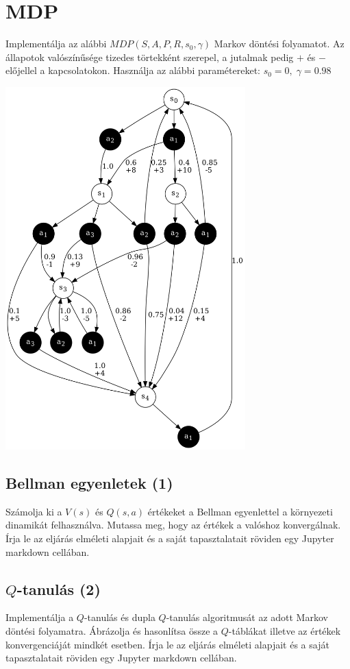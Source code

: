 \documentclass[english]{article}
\begin{document}
\newpage

\section{MDP}

Implementálja az alábbi $MDP(S,A,P,R,s_0,\gamma)$ Markov döntési folyamatot. Az állapotok valószínűsége tizedes törtekként szerepel, a jutalmak pedig $+$ és $-$ előjellel a kapcsolatokon. Használja az alábbi paramétereket: $s_0 = 0, \; \gamma=0.98$

\begin{center}
\includegraphics[width=\textwidth, height=14cm, keepaspectratio]{graphs/3_mdp.png}
\end{center}

\subsection{Bellman egyenletek (1)}
Számolja ki a $V(s)$ és $Q(s,a)$ értékeket a Bellman egyenlettel a környezeti dinamikát felhasználva. Mutassa meg, hogy az értékek a valóshoz konvergálnak. Írja le az eljárás elméleti alapjait és a saját tapasztalatait röviden egy Jupyter markdown cellában. 

\subsection{$Q$-tanulás (2)}
Implementálja a $Q$-tanulás és dupla $Q$-tanulás algoritmusát az adott Markov döntési folyamatra. Ábrázolja és hasonlítsa össze a $Q$-táblákat illetve az értékek konvergenciáját mindkét esetben. Írja le az eljárás elméleti alapjait és a saját tapasztalatait röviden egy Jupyter markdown cellában.
\end{document}
